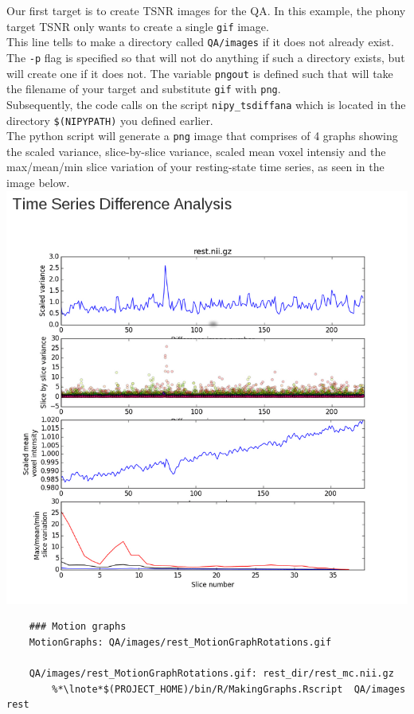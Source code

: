 \noindent{} Our first target is to create TSNR images for the QA. In this example, the phony target TSNR only wants \maken{} to create a single \texttt{gif} image. \\
 This line tells \maken{} to make a directory called \texttt{QA/images} if it does not already exist. The \texttt{-p} flag is specified so that \maken{} will not do anything if such a directory exists, but will create one if it does not. 
 The variable \texttt{pngout} is defined such that \maken{} will take the filename of your target and substitute \texttt{gif} with \texttt{png}.\\
 Subsequently, the code calls on the script \texttt{nipy\_tsdiffana} which is located in the directory \texttt{\$(NIPYPATH)} you defined earlier.\\ The python script will generate a \texttt{png} image that comprises of 4 graphs showing the scaled variance, slice-by-slice variance, scaled mean voxel intensiy and the max/mean/min slice variation of your resting-state time series, as seen in the image below. \\

\includegraphics[scale=0.5]{QAtsdiffana.png}

\begin{lstlisting}
	### Motion graphs
	MotionGraphs: QA/images/rest_MotionGraphRotations.gif 

	QA/images/rest_MotionGraphRotations.gif: rest_dir/rest_mc.nii.gz
		%*\lnote*$(PROJECT_HOME)/bin/R/MakingGraphs.Rscript  QA/images rest
\end{lstlisting}

